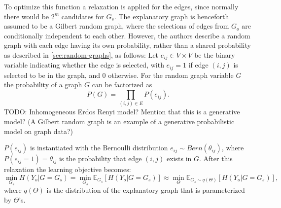 To optimize this function a relaxation is applied for the edges, since normally there would be $2^m$ candidates for $G_s$. The explanatory graph is henceforth assumed to be a Gilbert random graph, where the selections of edges from $G_o$ are conditionally independent to each other. However, the authors describe a random graph with each edge having its own probability, rather than a shared probability as described in \ref{sec:random-graphs}, as follows: Let $e_{ij}\in V \times V$ be the binary variable indicating whether the edge is selected, with $e_{ij} = 1$ if edge $(i,j)$ is selected to be in the graph, and 0 otherwise. For the random graph variable $G$ the probability of a graph $G$ can be factorized as 
\begin{equation}
    P(G) = \prod_{(i,j)\in E}P(e_{ij}).
\end{equation}
TODO: Inhomogeneous Erdos Renyi model? Mention that this is a generative model? (A Gilbert random graph is an example of a generative probabilistic model on graph data?)

 $P(e_{ij})$ is instantiated with the Bernoulli distribution $e_{ij} \sim Bern(\theta_{ij})$, where $P(e_{ij} = 1) = \theta_{ij}$ is the probability that edge $(i,j)$ exists in $G$.
After this relaxation the learning objective becomes:
\begin{equation}
    \label{eq:init_learning_obj}
    \min_{G_s}H(Y_o|G = G_s) = \min_{G_s} \mathbb{E}_{G_s}[H(Y_o|G = G_s)] \approx \min_{\Theta} \mathbb{E}_{G_s \sim q(\Theta)}[H(Y_o|G = G_s)],
\end{equation}
where $q(\Theta)$ is the distribution of the explanatory graph that is parameterized by $\Theta$'s.

